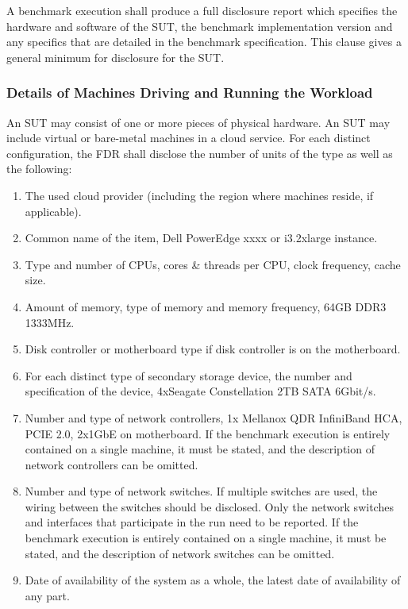 A benchmark execution shall produce a full disclosure report which specifies the hardware and software of the SUT, the benchmark implementation version and any specifics that are detailed in the benchmark specification. This clause gives a general minimum for disclosure for the SUT.

\subsubsection{Details of Machines Driving and Running the Workload}
An SUT may consist of one or more pieces of physical hardware. An SUT may include virtual or bare-metal machines in a cloud service.
For each distinct configuration, the FDR shall disclose the number of units of the type as well as the following:

\begin{enumerate}
    \item The used cloud provider (including the region where machines reside, if applicable).
    \item Common name of the item, \eg Dell PowerEdge xxxx or i3.2xlarge instance.
    \item Type and number of CPUs, cores \& threads per CPU, clock frequency, cache size.
    \item Amount of memory, type of memory and memory frequency, \eg 64GB DDR3 1333MHz.
    \item Disk controller or motherboard type if disk controller is on the motherboard.
    \item For each distinct type of secondary storage device, the number and specification of the device, \eg 4xSeagate Constellation 2TB SATA 6Gbit/s.
    \item Number and type of network controllers, \eg 1x Mellanox QDR InfiniBand HCA, PCIE 2.0, 2x1GbE on motherboard. If the benchmark execution is entirely contained on a single machine, it must be stated, and the description of network controllers can be omitted.
    \item Number and type of network switches. If multiple switches are used, the wiring between the switches should be disclosed.
    Only the network switches and interfaces that participate in the run need to be reported. If the benchmark execution is entirely contained on a single machine, it must be stated, and the description of network switches can be omitted.
    \item Date of availability of the system as a whole, \ie the latest date of availability of any part.
\end{enumerate}

